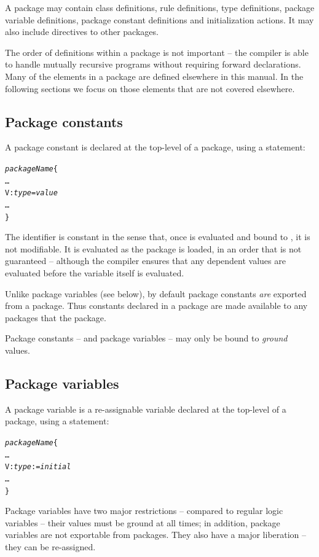 A package may contain class definitions, rule definitions, type definitions, package variable definitions, package constant definitions and initialization actions. It may also include directives to  other packages. 

The order of definitions within a package is not important -- the \go compiler is able to handle mutually recursive programs without requiring forward declarations. Many of the elements in a package are defined elsewhere in this manual. In the following sections we focus on those elements that are not covered elsewhere.

\subsection{Package constants}
\label{package:constant}

A package constant is declared at the top-level of a package, using a \q{=} statement:
\begin{alltt}
\emph{packageName}\{
  \ldots
  V:\emph{type} = \emph{value}
  \ldots
\}
\end{alltt}
The identifier  is constant in the sense that, once  is evaluated and bound to , it is not modifiable. It is evaluated as the package is loaded, in an order that is not guaranteed -- although the compiler ensures that any dependent values are evaluated before the variable itself is evaluated.

Unlike package variables (see below), by default package constants \emph{are} exported from a package. Thus constants declared in a package are made available to any packages that  the package.

Package constants -- and package variables -- may only be bound to \emph{ground} values.

\subsection{Package variables}
\label{package:variable}

A package variable is a re-assignable variable declared at the top-level of a package, using a \q{:=} statement:
\begin{alltt}
\emph{packageName}\{
  \ldots
  V:\emph{type} := \emph{initial}
  \ldots
\}
\end{alltt}
Package variables have two major restrictions -- compared to regular logic variables -- their values must be ground at all times; in addition, package variables are not exportable from packages. They also have a major liberation -- they can be re-assigned.



